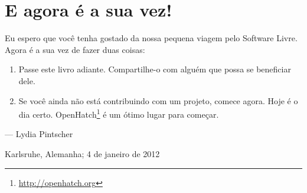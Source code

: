 \chapter*{E agora é a sua vez!}
Eu espero que você tenha gostado da nossa pequena viagem pelo Software Livre. Agora é a sua vez de fazer duas coisas:
\begin{enumerate}
 \item Passe este livro adiante. Compartilhe-o com alguém que possa se beneficiar dele.
 \item Se você ainda não está contribuindo com um projeto, comece agora. Hoje é o dia certo. OpenHatch\footnote{\url{http://openhatch.org}} é um ótimo lugar para começar.
\end{enumerate}

\begin{flushright}--- Lydia Pintscher\end{flushright}
\begin{flushright}Karlsruhe, Alemanha; 4 de janeiro de 2012\end{flushright}
